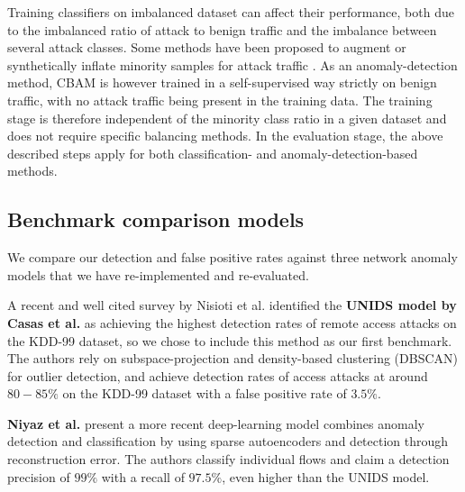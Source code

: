 Training classifiers on imbalanced dataset can affect their performance, both due to the imbalanced ratio of attack to benign traffic and the imbalance between several attack classes. Some methods have been proposed to augment or synthetically inflate minority samples for attack traffic \cite{liu2020intrusion}. As an anomaly-detection method, CBAM is however trained in a self-supervised way strictly on benign traffic, with no attack traffic being present in the training data. The training stage is therefore independent of the minority class ratio in a given dataset and does not require specific balancing methods. In the evaluation stage, the above described steps apply for both classification- and anomaly-detection-based methods.


\subsection{Benchmark comparison models}\label{SecF:Benchmark}

We compare our detection and false positive rates against three network anomaly models that we have re-implemented and re-evaluated. 

A recent and well cited survey by Nisioti et al. \cite{nisioti2018intrusion} identified the \textbf{UNIDS model by Casas et al.} \cite{casas2012unsupervised} as achieving the highest detection rates of remote access attacks on the KDD-99 dataset, so we chose to include this method as our first benchmark. The authors rely on subspace-projection and density-based clustering (DBSCAN) for outlier detection, and %
achieve detection rates of access attacks at around $80-85\%$ on the KDD-99 dataset with a false positive rate of $3.5\%$. %

\textbf{Niyaz et al.} \cite{javaid2016deep} present a more recent deep-learning model combines anomaly detection and classification by using sparse autoencoders and detection through reconstruction error. %
The authors classify individual flows and claim a detection precision of $99\%$ with a recall of $97.5\%$, even higher than the UNIDS model.

